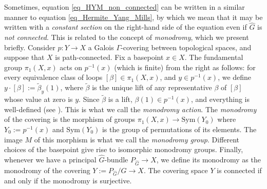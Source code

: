 Sometimes, equation \eqref{eq_HYM_non_connected} can be written in a similar manner to equation \eqref{eq_Hermite_Yang_Mills}, by which we mean that it may be written with a \textit{constant section} on the right-hand side of the equation even if \(\hat{G}\) is \textit{not connected}. This is related to the concept of \textit{monodromy}, which we present briefly. Consider \(p\colon Y \to X\) a Galois \(\Gamma\)-covering between topological spaces, and suppose that \(X\) is path-connected. Fix a basepoint \(x \in X\). The fundamental group \(\pi_1(X,x)\) acts on \(p^{-1}(x)\) (which is finite) from the right as follows: for every equivalence class of loops \([\beta]\in \pi_1(X,x)\), and \(y \in p^{-1}(x)\), we define \(y\cdot [\beta]:=\tilde{\beta}_y(1)\), where \(\tilde{\beta}\) is the unique lift of any representative \(\beta\) of \([\beta]\) whose value at zero is \(y\). Since \(\tilde{\beta}\) is a lift, \(\beta(1)\in p^{-1}(x)\), and everything is well-defined (see \parencite[Th. 11.22]{lee_introTM}). This is what we call the \textit{monodromy action}. The \textit{monodromy} of the covering is the morphism of groups \(\pi_1(X,x)\to \mathrm{Sym}(Y_0)\) where \(Y_0:=p^{-1}(x)\) and \(\mathrm{Sym}(Y_0)\) is the group of permutations of its elements. The image \(M\) of this morphism is what we call the \textit{monodromy group}. Different choices of the basepoint give rise to isomorphic monodromy groups. Finally, whenever we have a principal \(\hat{G}\)-bundle \(P_{\hat{G}}\to X\), we define its monodromy as the monodromy of the covering \(Y:=P_{\hat{G}}/G \to X\). The covering space \(Y\) is connected if and only if the monodromy is surjective.

